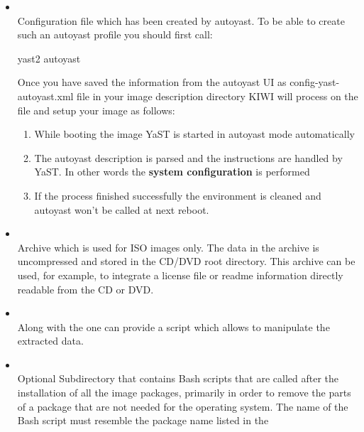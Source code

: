 \begin{itemize}
\item {}\\
      Configuration file which has been created by autoyast.
      To be able to create such an autoyast profile you should first
      call:

      \begin{Command}{8cm}
      yast2 autoyast
      \end{Command}

      Once you have saved the information from the autoyast UI as
      config-yast-autoyast.xml file in your image description directory KIWI
      will process on the file and setup your image as follows:
      \begin{enumerate}
      \item While booting the image YaST is started in autoyast mode
            automatically
      \item The autoyast description is parsed and the instructions are
            handled by YaST. In other words the \textbf{system configuration}
            is performed
      \item If the process finished successfully the environment is
            cleaned and autoyast won't be called at next reboot.
      \end{enumerate}

\item {}\\
      Archive which is used for ISO images only. The data in the archive is
      uncompressed and stored in the CD/DVD root directory. This
      archive can be used, for example, to integrate a license file or
      readme information directly readable from the CD or DVD.

\item {}\\
      Along with the  one can provide a script which allows
      to manipulate the extracted data.

\item {}\\
      Optional Subdirectory that contains Bash scripts that are called
      after the installation of all the image packages, primarily in order
      to remove the parts of a package that are not needed for the operating
      system. The name of the Bash script must resemble the package name
      listed in the 
\end{itemize}

